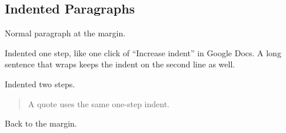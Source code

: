 \subsection{Indented Paragraphs}

Normal paragraph at the margin.

\begin{indented}
Indented one step, like one click of ``Increase indent'' in Google Docs. A long
sentence that wraps keeps the indent on the second line as well.
\end{indented}

\begin{indented}[2]
Indented two steps.
\end{indented}

\begin{quote}
A quote uses the same one-step indent.
\end{quote}

Back to the margin.
